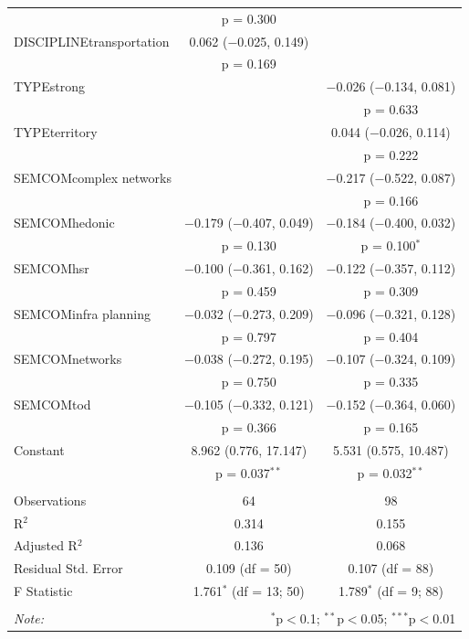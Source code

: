 \begin{table}
\begin{tabular}{@{\extracolsep{5pt}}lcc}
  & p = 0.300 &  \\ 
  DISCIPLINEtransportation & 0.062 ($-$0.025, 0.149) &  \\ 
  & p = 0.169 &  \\ 
  TYPEstrong &  & $-$0.026 ($-$0.134, 0.081) \\ 
  &  & p = 0.633 \\ 
  TYPEterritory &  & 0.044 ($-$0.026, 0.114) \\ 
  &  & p = 0.222 \\ 
  SEMCOMcomplex networks &  & $-$0.217 ($-$0.522, 0.087) \\ 
  &  & p = 0.166 \\ 
  SEMCOMhedonic & $-$0.179 ($-$0.407, 0.049) & $-$0.184 ($-$0.400, 0.032) \\ 
  & p = 0.130 & p = 0.100$^{*}$ \\ 
  SEMCOMhsr & $-$0.100 ($-$0.361, 0.162) & $-$0.122 ($-$0.357, 0.112) \\ 
  & p = 0.459 & p = 0.309 \\ 
  SEMCOMinfra planning & $-$0.032 ($-$0.273, 0.209) & $-$0.096 ($-$0.321, 0.128) \\ 
  & p = 0.797 & p = 0.404 \\ 
  SEMCOMnetworks & $-$0.038 ($-$0.272, 0.195) & $-$0.107 ($-$0.324, 0.109) \\ 
  & p = 0.750 & p = 0.335 \\ 
  SEMCOMtod & $-$0.105 ($-$0.332, 0.121) & $-$0.152 ($-$0.364, 0.060) \\ 
  & p = 0.366 & p = 0.165 \\ 
  Constant & 8.962 (0.776, 17.147) & 5.531 (0.575, 10.487) \\ 
  & p = 0.037$^{**}$ & p = 0.032$^{**}$ \\ 
 \hline \\[-1.8ex] 
Observations & 64 & 98 \\ 
R$^{2}$ & 0.314 & 0.155 \\ 
Adjusted R$^{2}$ & 0.136 & 0.068 \\ 
Residual Std. Error & 0.109 (df = 50) & 0.107 (df = 88) \\ 
F Statistic & 1.761$^{*}$ (df = 13; 50) & 1.789$^{*}$ (df = 9; 88) \\ 
\hline 
\hline \\[-1.8ex] 
\textit{Note:}  & \multicolumn{2}{r}{$^{*}$p$<$0.1; $^{**}$p$<$0.05; $^{***}$p$<$0.01} \\ 
\end{tabular} 
\end{table} 




